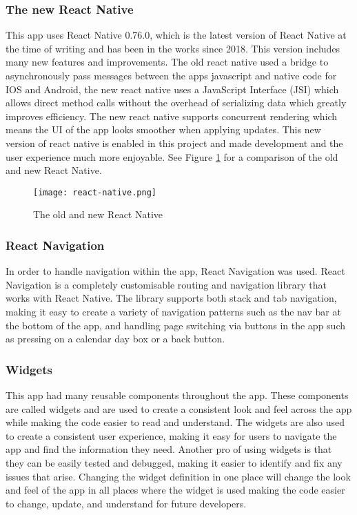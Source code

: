 \subsubsection{The new React Native}
This app uses React Native 0.76.0, which is the latest version of React Native at the time of writing and has been in the works since 2018. This version includes many new features and improvements. The old react native used a bridge to asynchronously pass messages between the apps javascript and native code for IOS and Android, the new react native uses a JavaScript Interface (JSI) which allows direct method calls without the overhead of serializing data which greatly improves efficiency\cite{ReactNative2024}. The new react native supports concurrent rendering which means the UI of the app looks smoother when applying updates. This new version of react native is enabled in this project and made development and the user experience much more enjoyable. See Figure \ref{figure:react-native} for a comparison of the old and new React Native.

\begin{figure}[h!!]
    \begin{center}
      \texttt{[image: react-native.png]}
      \caption{The old and new React Native\cite{ReactNative2024}}
      \label{figure:react-native}
    \end{center}
  \end{figure}

\subsubsection{React Navigation}
In order to handle navigation within the app, React Navigation was used. React Navigation is a completely customisable routing and navigation library that works with React Native. The library supports both stack and tab navigation, making it easy to create a variety of navigation patterns such as the nav bar at the bottom of the app, and handling page switching via buttons in the app such as pressing on a calendar day box or a back button. 

\subsubsection{Widgets}
This app had many reusable components throughout the app. These components are called widgets and are used to create a consistent look and feel across the app while making the code easier to read and understand. The widgets are also used to create a consistent user experience, making it easy for users to navigate the app and find the information they need. Another pro of using widgets is that they can be easily tested and debugged, making it easier to identify and fix any issues that arise. Changing the widget definition in one place will change the look and feel of the app in all places where the widget is used making the code easier to change, update, and understand for future developers. 

